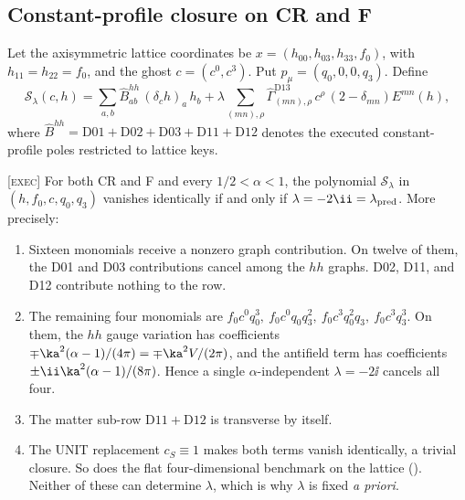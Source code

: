 \subsection{Constant-profile closure on CR and F}

Let the axisymmetric lattice coordinates be
\(x=(h_{00},h_{03},h_{33},f_0)\), with
\(h_{11}=h_{22}=f_0\), and the ghost \(c=(c^0,c^3)\).
Put \(p_\mu=(q_0,0,0,q_3)\).
Define
\begin{equation}
\mathcal S_\lambda(c,h)=
\sum_{a,b}\widehat B^{hh}_{ab}\,(\delta_ch)_a\,h_b
+\lambda\sum_{(mn),\rho}
\widehat\Gamma^{\mathrm{D13}}_{(mn),\rho}\,c^\rho\,
(2-\delta_{mn})E^{mn}(h),
\label{eq:STv6}
\end{equation}
where
\(\widehat B^{hh}=\mathrm{D01+D02+D03+D11+D12}\)
denotes the executed constant-profile poles restricted to lattice
keys.

\begin{theorem}
\label{thm:STclosure}
\textsc{[exec]}
For both CR and F and every \(1/2<\alpha<1\), the polynomial
\(\mathcal S_\lambda\) in
\((h,f_0,c,q_0,q_3)\) vanishes identically if and only if
\(\lambda=-2\ii=\lambda_{\rm pred}\).
More precisely:
\begin{enumerate}[label=\textup{(\roman*)}]
\item Sixteen monomials receive a nonzero graph contribution.
On twelve of them, the D01 and D03 contributions cancel among the
\(hh\) graphs.
D02, D11, and D12 contribute nothing to the row.
\item The remaining four monomials are
\(f_0c^0q_0^3,\ f_0c^0q_0q_3^2,\ f_0c^3q_0^2q_3,\ f_0c^3q_3^3\).
On them, the \(hh\) gauge variation has coefficients
\(\mp\ka^2(\alpha-1)/(4\pi)=\mp\ka^2V/(2\pi)\), and the antifield
term has coefficients
\(\pm\ii\ka^2(\alpha-1)/(8\pi)\).
Hence a single \(\alpha\)-independent \(\lambda=-2\ii\) cancels
all four.
\item The matter sub-row \(\mathrm{D11}+\mathrm{D12}\) is
transverse by itself.
\item The UNIT replacement \(c_S\equiv1\) makes both terms vanish
identically, a trivial closure.
So does the flat four-dimensional benchmark on the lattice
().
Neither of these can determine \(\lambda\), which is why
\(\lambda\) is fixed \emph{a priori}.
\end{enumerate}
\end{theorem}

